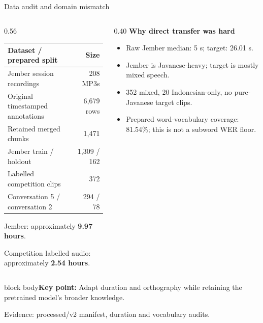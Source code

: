 \documentclass[aspectratio=169,11pt]{beamer}
\newcommand{\takeaway}[1]{\vfill\begin{beamercolorbox}[sep=2mm,wd=\linewidth]{block body}\small\textbf{Key point:} #1\end{beamercolorbox}}
\newcommand{\evidence}[1]{\vspace{1mm}\par{\tiny\color{slate}Evidence: #1\par}}
\begin{document}
\begin{frame}{Data audit and domain mismatch}
\begin{columns}[T]
\begin{column}{0.56\textwidth}
\small
\begin{tabular}{@{}lr@{}}\toprule
\textbf{Dataset / prepared split}&\textbf{Size}\\\midrule
Jember session recordings&208 MP3s\\
Original timestamped annotations&6,679 rows\\
Retained merged chunks&1,471\\
Jember train / holdout&1,309 / 162\\
Labelled competition clips&372\\
Conversation 5 / conversation 2&294 / 78\\\bottomrule
\end{tabular}
\vspace{3mm}\par
Jember: approximately \textbf{9.97 hours}.\par
Competition labelled audio: approximately \textbf{2.54 hours}.
\end{column}
\begin{column}{0.40\textwidth}
\textbf{Why direct transfer was hard}
\begin{itemize}\item Raw Jember median: 5 s; target: 26.01 s.
\item Jember is Javanese-heavy; target is mostly mixed speech.
\item 352 mixed, 20 Indonesian-only, no pure-Javanese target clips.
\item Prepared word-vocabulary coverage: 81.54\%; this is not a subword WER floor.
\end{itemize}
\end{column}
\end{columns}
\takeaway{Adapt duration and orthography while retaining the pretrained model's broader knowledge.}
\evidence{processed/v2 manifest, duration and vocabulary audits.}
\end{frame}
\end{document}

